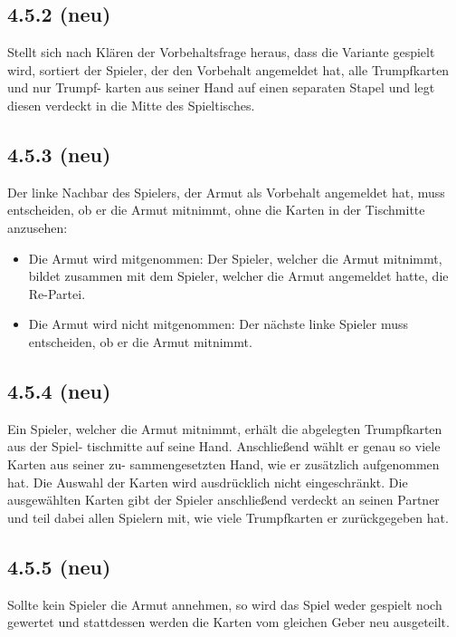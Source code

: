 \subsection*{4.5.2 (neu)}

Stellt sich nach Klären der Vorbehaltsfrage heraus, dass die Variante
 gespielt wird, sortiert der Spieler, der den Vorbehalt
angemeldet hat, alle Trumpfkarten und nur Trumpf- karten aus seiner Hand
auf einen separaten Stapel und legt diesen verdeckt in die Mitte des
Spieltisches.

\subsection*{4.5.3 (neu)}

Der linke Nachbar des Spielers, der Armut als Vorbehalt angemeldet hat,
muss entscheiden, ob er die Armut mitnimmt, ohne die Karten in der
Tischmitte anzusehen:

\begin{itemize}
    \item Die Armut wird mitgenommen: Der Spieler, welcher die Armut
        mitnimmt, bildet zusammen mit dem Spieler, welcher die Armut
        angemeldet hatte, die Re-Partei.
    \item Die Armut wird nicht mitgenommen: Der nächste linke Spieler
        muss entscheiden, ob er die Armut mitnimmt.
\end{itemize}

\subsection*{4.5.4 (neu)}

Ein Spieler, welcher die Armut mitnimmt, erhält die abgelegten
Trumpfkarten aus der Spiel- tischmitte auf seine Hand. Anschließend
wählt er genau so viele Karten aus seiner zu- sammengesetzten Hand, wie
er zusätzlich aufgenommen hat. Die Auswahl der Karten wird
ausdrücklich nicht eingeschränkt. Die ausgewählten Karten gibt der
Spieler anschließend verdeckt an seinen Partner und teil dabei allen
Spielern mit, wie viele Trumpfkarten er zurückgegeben hat.

\subsection*{4.5.5 (neu)}

Sollte kein Spieler die Armut annehmen, so wird das Spiel weder gespielt
noch gewertet und stattdessen werden die Karten vom gleichen Geber neu
ausgeteilt.

